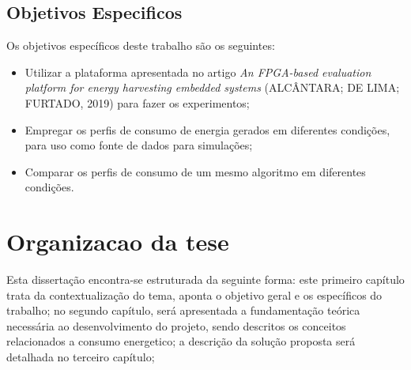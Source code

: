 \subsection{Objetivos Especificos}
Os objetivos específicos deste trabalho são os seguintes:
\begin{itemize}
    \item 	Utilizar a plataforma apresentada no artigo {\itshape An FPGA-based evaluation platform for energy harvesting embedded systems} (ALCÂNTARA; DE LIMA; FURTADO, 2019) para fazer os experimentos;
    
    \item 	Empregar os perfis de consumo de energia gerados em diferentes condições, para uso como fonte de dados para simulações;
     
     \item 	Comparar os perfis de consumo de um mesmo algoritmo em diferentes condições.

\end{itemize}



\section{Organizacao da tese}

Esta dissertação encontra-se estruturada da seguinte forma: este primeiro capítulo
trata da contextualização do tema, aponta o objetivo geral e os específicos do trabalho;
no segundo capítulo, será apresentada a fundamentação teórica necessária ao desenvolvimento do projeto, sendo descritos os conceitos relacionados a consumo energetico; a descrição da solução proposta será detalhada no terceiro capítulo;
